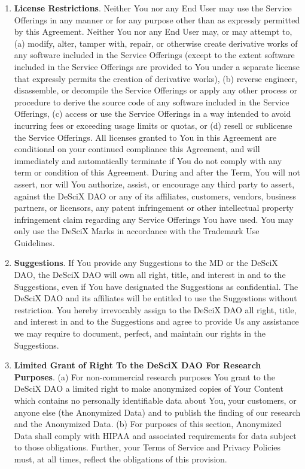 \documentclass{article}
\begin{document}
\begin{enumerate}
\begin{enumerate}
        \item \textbf{License Restrictions}. Neither You nor any End User may use the Service Offerings in any manner or for any purpose other than as expressly permitted by this Agreement. Neither You nor any End User may, or may attempt to, (a) modify, alter, tamper with, repair, or otherwise create derivative works of any software included in the Service Offerings (except to the extent software included in the Service Offerings are provided to You under a separate license that expressly permits the creation of derivative works), (b) reverse engineer, disassemble, or decompile the Service Offerings or apply any other process or procedure to derive the source code of any software included in the Service Offerings, (c) access or use the Service Offerings in a way intended to avoid incurring fees or exceeding usage limits or quotas, or (d) resell or sublicense the Service Offerings. All licenses granted to You in this Agreement are conditional on your continued compliance this Agreement, and will immediately and automatically terminate if You do not comply with any term or condition of this Agreement. During and after the Term, You will not assert, nor will You authorize, assist, or encourage any third party to assert, against the DeSciX DAO or any of its affiliates, customers, vendors, business partners, or licensors, any patent infringement or other intellectual property infringement claim regarding any Service Offerings You have used. You may only use the DeSciX Marks in accordance with the Trademark Use Guidelines.
        
        \item \textbf{Suggestions}. If You provide any Suggestions to the MD or the DeSciX DAO, the DeSciX DAO will own all right, title, and interest in and to the Suggestions, even if You have designated the Suggestions as confidential. The DeSciX DAO and its affiliates will be entitled to use the Suggestions without restriction. You hereby irrevocably assign to the DeSciX DAO all right, title, and interest in and to the Suggestions and agree to provide Us any assistance we may require to document, perfect, and maintain our rights in the Suggestions.
        
        \item \textbf{Limited Grant of Right To the DeSciX DAO For Research Purposes}. (a) For non-commercial research purposes You grant to the DeSciX DAO a limited right to make anonymized copies of Your Content which contains no personally identifiable data about You, your customers, or anyone else (the Anonymized Data) and to publish the finding of our research and the Anonymized Data. (b) For purposes of this section, Anonymized Data shall comply with HIPAA and associated requirements for data subject to those obligations. Further, your Terms of Service and Privacy Policies must, at all times, reflect the obligations of this provision.
    \end{enumerate}


\end{enumerate}
\end{document}
